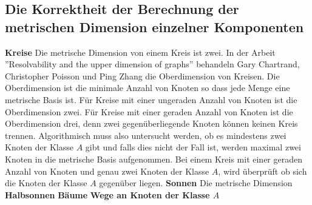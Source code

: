 \subsection{Die Korrektheit der Berechnung der metrischen Dimension einzelner Komponenten}
\label{korrkomp}
\textbf{Kreise}\newline
Die metrische Dimension von einem Kreis ist zwei. In der Arbeit ''Resolvability and the upper dimension of graphs'' \cite{upper} behandeln Gary Chartrand, Christopher Poisson und Ping Zhang die Oberdimension von Kreisen. Die Oberdimension ist die minimale Anzahl von Knoten so dass jede Menge eine metrische Basis ist.\newline
Für Kreise mit einer ungeraden Anzahl von Knoten ist die Oberdimension zwei.\newline
Für Kreise mit einer geraden Anzahl von Knoten ist die Oberdimension drei, denn zwei gegenüberliegende Knoten können keinen Kreis trennen. Algorithmisch muss also untersucht werden, ob es mindestens zwei Knoten der Klasse $A$ gibt und falls dies nicht der Fall ist, werden maximal zwei Knoten in die metrische Basis aufgenommen. Bei einem Kreis mit einer geraden Anzahl von Knoten und genau zwei Knoten der Klasse $A$, wird überprüft ob sich die Knoten der Klasse $A$ gegenüber liegen.\newline\newline
\textbf{Sonnen}\newline
Die metrische Dimension 
\textbf{Halbsonnen}\newline
\textbf{Bäume}\newline
\textbf{Wege an Knoten der Klasse $A$}\newline
